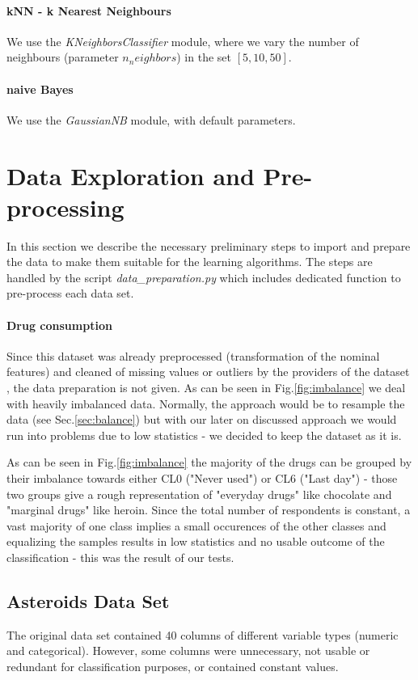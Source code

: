 \documentclass{article}
\begin{document}
\paragraph{kNN - k Nearest Neighbours} We use the \textit{KNeighborsClassifier} module, where we vary the number of neighbours (parameter $n_neighbors$) in the set $[5,10,50]$.

\paragraph{naive Bayes}  We use the \textit{GaussianNB} module, with default parameters.



\section{Data Exploration and Pre-processing}
In this section we describe the necessary preliminary steps to import and prepare the data to make them suitable for the learning algorithms.
The steps are handled by the script \textit{data\_preparation.py} which includes dedicated function to pre-process each data set.

\paragraph{Drug consumption}
Since this dataset was already preprocessed (transformation of the nominal features) and cleaned of missing values or outliers by the providers of the dataset \cite{fehrman2017factor}, the data preparation is not given. As can be seen in Fig.\ref{fig:imbalance} we deal with heavily imbalanced data. Normally, the approach would be to resample the data (see Sec.\ref{sec:balance}) but with our later on discussed approach we would run into problems due to low statistics - we decided to keep the dataset as it is.

 As can be seen in Fig.\ref{fig:imbalance} the majority of the drugs can be grouped by their imbalance towards either CL0 ("Never used") or CL6 ("Last day") - those two groups give a rough representation of "everyday drugs" like chocolate and "marginal drugs" like heroin. Since the total number of respondents is constant, a vast majority of one class implies a small occurences of the other classes and equalizing the samples results in low statistics and no usable outcome of the classification - this was the result of our tests. \\

\subsection{Asteroids Data Set}
The original data set contained 40 columns of different variable types (numeric and categorical). However, some columns were unnecessary, not usable or redundant for classification purposes, or contained constant values.
\end{document}
